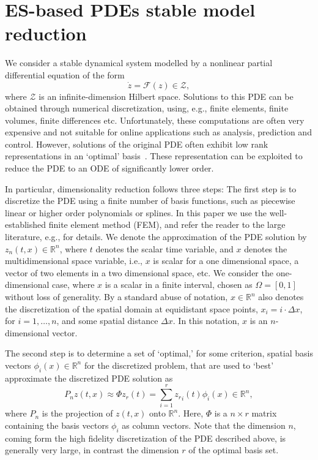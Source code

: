 \documentclass[letterpaper,conference,onecolumn,11pt]{IEEEtran}
\begin{document}
\section{ES-based PDEs stable model reduction}
\label{es-rom-stab} We consider a stable dynamical system modelled
by a nonlinear partial differential equation of the form
\begin{equation}\label{general_PDE_chap3}
\dot{z} = \mathcal{F}(z) \in\mathcal{Z},
\end{equation}
where $\mathcal{Z}$ is an infinite-dimension Hilbert space.
Solutions to this PDE can be obtained through numerical
discretization, using, e.g., finite elements, finite volumes,
finite differences etc. Unfortunately, these computations are
often very expensive and not suitable for online applications such
as analysis, prediction and control. However, solutions of the
original PDE often exhibit low rank representations in an
`optimal' basis~\cite{HLB98}. These representation can be
exploited to reduce the PDE to an ODE of significantly lower
order.

In particular, dimensionality reduction follows three steps: The first
step is to discretize the PDE using a finite number of basis
functions, such as piecewise linear or higher order polynomials or
splines. In this paper we use the well-established finite element
method (FEM), and refer the reader to the large literature, e.g.,
\cite{S97,f83} for details. We denote the approximation of the PDE
solution by $z_n(t,x) \in \mathbb{R}^n$, where $t$ denotes the scalar
time variable, and $x$ denotes the multidimensional space variable,
i.e., $x$ is scalar for a one dimensional space, a vector of two
elements in a two dimensional space, etc. We consider the
one-dimensional case, where $x$ is a scalar in a finite interval,
chosen as $ \Omega = [0,1]$ without loss of generality. By a standard
abuse of notation, $x \in \mathbb{R}^n$ also denotes the
discretization of the spatial domain at equidistant space points, $x_i
= i\cdot \Delta x$, for $i=1,\ldots,n$, and some spatial distance
$\Delta x$. In this notation, $x$ is an $n$-dimensional vector.

The second step is to determine a set of `optimal,' for some
criterion, spatial basis vectors $\phi_i(x) \in \mathbb{R}^n$ for the
discretized problem, that are used to `best' approximate the
discretized PDE solution as
\begin{equation}\label{x_appro1_chap3}
P_n z(t,x) \approx \Phi z_r(t) = \sum_{i=1}^{r} {z_r}_{i}(t) \phi_i(x)
\in \mathbb{R}^n,
\end{equation}
where $P_n$ is the projection of $z(t,x)$ onto $\mathbb{R}^n$. Here,
$\Phi$ is a $n \times r$ matrix containing the basis vectors $\phi_i$
as column vectors. Note that the dimension $n$, coming form the high
fidelity discretization of the PDE described above, is generally very
large, in contrast the dimension $r$ of the optimal basis set.
\end{document}

